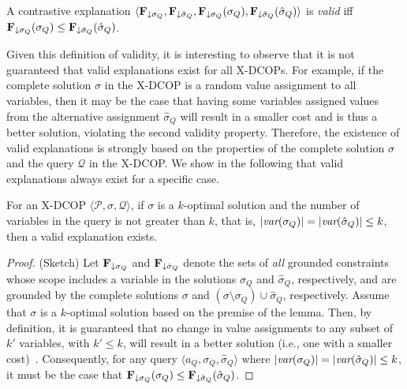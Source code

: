 \documentclass[twoside,11pt]{article}
\begin{document}
\begin{definition}[Validity]\label{def:validity}
A contrastive explanation 
$\langle {\bf{F}}_{\downarrow \sigma_Q}, {\bf{F}}_{\downarrow \hat{\sigma}_Q}, {\bf{F}}_{\downarrow \sigma_Q}(\sigma_Q), {\bf{F}}_{\downarrow \hat{\sigma}_Q}(\hat{\sigma}_Q) \rangle$
is \emph{valid} iff ${\bf{F}}_{\downarrow \sigma_Q}(\sigma_Q) \leq {\bf{F}}_{\downarrow \hat{\sigma}_Q}(\hat{\sigma}_Q)$.
\end{definition}


Given this definition of validity, it is interesting to observe that it is not guaranteed that valid explanations exist for all X-DCOPs. For example, if the complete solution $\sigma$ in the X-DCOP is a random value assignment to all variables, then it may be the case that having some variables assigned values from the alternative assignment $\hat{\sigma}_Q$ will result in a smaller cost and is thus a better solution, violating the second validity property. Therefore, the existence of valid explanations is strongly based on the properties of the complete solution $\sigma$ and the query $\mathcal{Q}$ in the X-DCOP. We show in the following that valid explanations always exist for a specific case.

\begin{theorem}
For an X-DCOP $\langle \mathcal{P}, \sigma, \mathcal{Q} \rangle$, if $\sigma$ is a $k$-optimal solution and the number of variables in the query is not greater than $k$, that is, $|{\textit{var}(\sigma_Q)}| = |{\textit{var}(\hat{\sigma}_Q)}| \leq k$, then a valid explanation exists. 
\label{theorem:existence}
\end{theorem}
\begin{proof} (Sketch)
Let ${\bf{F}}_{\downarrow \sigma_Q}$ and ${\bf{F}}_{\downarrow \hat{\sigma}_Q}$ denote the sets of \emph{all} grounded constraints whose scope includes a variable in the solutions $\sigma_Q$ and $\hat{\sigma}_Q$, respectively, and are grounded by the complete solutions $\sigma$ and $(\sigma \setminus \sigma_Q) \cup \hat{\sigma}_Q$, respectively.
Assume that $\sigma$ is a $k$-optimal solution based on the premise of the lemma. Then, by definition, it is guaranteed that no change in value assignments to any subset of $k'$ variables, with $k' \leq k$, will result in a better solution (i.e., one with a smaller cost)~\cite{pearce:07}. Consequently, for any query $\langle a_Q, \sigma_Q, \hat{\sigma}_Q \rangle$ where $|{\textit{var}(\sigma_Q)}| = |{\textit{var}(\hat{\sigma}_Q)}| \leq k$, it must be the case that ${\bf{F}}_{\downarrow \sigma_Q}(\sigma_Q) \leq {\bf{F}}_{\downarrow \hat{\sigma}_Q}(\hat{\sigma}_Q)$.
\end{proof}
\end{document}
